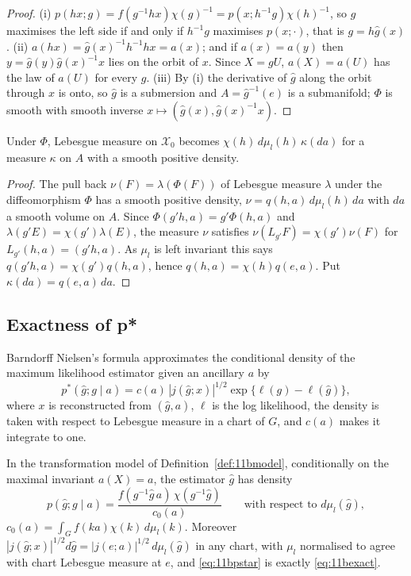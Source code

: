 \begin{proof}
(i) $p(hx;g)=f(g^{-1}hx)\chi(g)^{-1}=p(x;h^{-1}g)\chi(h)^{-1}$, so $g$ maximises the left side if and only if $h^{-1}g$ maximises $p(x;\cdot)$, that is $g=h\hat g(x)$. (ii) $a(hx)=\hat g(x)^{-1}h^{-1}hx=a(x)$; and if $a(x)=a(y)$ then $y=\hat g(y)\hat g(x)^{-1}x$ lies on the orbit of $x$. Since $X=gU$, $a(X)=a(U)$ has the law of $a(U)$ for every $g$. (iii) By (i) the derivative of $\hat g$ along the orbit through $x$ is onto, so $\hat g$ is a submersion and $A=\hat g^{-1}(e)$ is a submanifold; $\Phi$ is smooth with smooth inverse $x\mapsto(\hat g(x),\hat g(x)^{-1}x)$.
\end{proof}

\begin{lemma}\label{thm:11bdisint}
Under $\Phi$, Lebesgue measure on $\mathcal X_0$ becomes $\chi(h)\,d\mu_l(h)\,\kappa(da)$ for a measure $\kappa$ on $A$ with a smooth positive density.
\end{lemma}

\begin{proof}
The pull back $\nu(F)=\lambda(\Phi(F))$ of Lebesgue measure $\lambda$ under the diffeomorphism $\Phi$ has a smooth positive density, $\nu=q(h,a)\,d\mu_l(h)\,da$ with $da$ a smooth volume on $A$. Since $\Phi(g'h,a)=g'\Phi(h,a)$ and $\lambda(g'E)=\chi(g')\lambda(E)$, the measure $\nu$ satisfies $\nu(L_{g'}F)=\chi(g')\nu(F)$ for $L_{g'}(h,a)=(g'h,a)$. As $\mu_l$ is left invariant this says $q(g'h,a)=\chi(g')q(h,a)$, hence $q(h,a)=\chi(h)q(e,a)$. Put $\kappa(da)=q(e,a)\,da$.
\end{proof}

\subsection{Exactness of p*}

Barndorff Nielsen's formula approximates the conditional density of the maximum likelihood estimator given an ancillary $a$ by
\begin{equation}\label{eq:11bpstar}
p^*(\hat g;g\mid a)=c(a)\,|j(\hat g;x)|^{1/2}\exp\{\ell(g)-\ell(\hat g)\},
\end{equation}
where $x$ is reconstructed from $(\hat g,a)$, $\ell$ is the log likelihood, the density is taken with respect to Lebesgue measure in a chart of $G$, and $c(a)$ makes it integrate to one.

\begin{theorem}\label{thm:11bpstar}
In the transformation model of Definition~\ref{def:11bmodel}, conditionally on the maximal invariant $a(X)=a$, the estimator $\hat g$ has density
\begin{equation}\label{eq:11bexact}
p(\hat g;g\mid a)=\frac{f(g^{-1}\hat g\,a)\,\chi(g^{-1}\hat g)}{c_0(a)}\qquad\text{with respect to }d\mu_l(\hat g),
\end{equation}
$c_0(a)=\int_Gf(ka)\chi(k)\,d\mu_l(k)$. Moreover $|j(\hat g;x)|^{1/2}d\hat g=|j(e;a)|^{1/2}\,d\mu_l(\hat g)$ in any chart, with $\mu_l$ normalised to agree with chart Lebesgue measure at $e$, and \eqref{eq:11bpstar} is exactly \eqref{eq:11bexact}.
\end{theorem}

